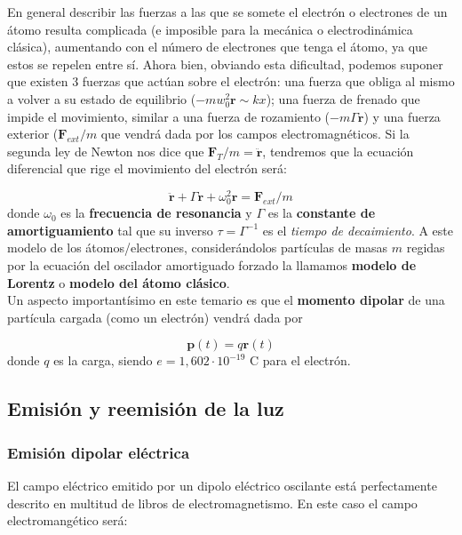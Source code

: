 \documentclass[12pt]{article}
\newcommand{\Fn}{\mathbf{F}}
\newcommand{\rn}{\mathbf{r}}
\newcommand{\pn}{\mathbf{p}}
\numberwithin{equation}{section}
\numberwithin{figure}{section}
\begin{document}
En general describir las fuerzas a las que se somete el electrón o electrones de un átomo resulta complicada (e imposible para la mecánica o electrodinámica clásica), aumentando con el número de electrones que tenga el átomo, ya que estos se repelen entre sí. Ahora bien, obviando esta dificultad, podemos suponer que existen 3 fuerzas que actúan sobre el electrón: una fuerza que obliga al mismo a volver a su estado de equilibrio ($- m w^2_0 \rn \sim kx$); una fuerza de frenado que impide el movimiento, similar a una fuerza de rozamiento ($-m \Gamma \dot{\rn}$) y una fuerza exterior ($\Fn_{ext}/m$ que vendrá dada por los campos electromagnéticos. Si la segunda ley de Newton nos dice que $\Fn_T / m = \ddot{\rn}$, tendremos que la ecuación diferencial que rige el movimiento del electrón será:

\begin{equation}
\ddot{\rn} + \Gamma \dot{\rn} + \omega_0^2 \rn = \Fn_{ext}/m
\end{equation}
donde $\omega_0$ es la \textbf{frecuencia de resonancia} y $\Gamma$ es la \textbf{constante de amortiguamiento} tal que su inverso $\tau = \Gamma^{-1}$ es el \textit{tiempo de decaimiento}. A este modelo de los átomos/electrones, considerándolos partículas de masas $m$ regidas por la ecuación del oscilador amortiguado forzado la llamamos \textbf{modelo de Lorentz} o \textbf{modelo del átomo clásico}.\\

Un aspecto importantísimo en este temario es que el \textbf{momento dipolar} de una partícula cargada (como un electrón) vendrá dada por 

\begin{equation}
\pn (t) = q \rn (t) \label{Ec:7.1.0.02}
\end{equation}
donde $q$ es la carga, siendo $e=1,602 \cdot 10^{-19}$ C para el electrón.
 
\subsection{Emisión y reemisión de la luz}

\subsubsection{Emisión dipolar eléctrica} \label{Subsub:7.2.1}

El campo eléctrico emitido por un dipolo eléctrico oscilante está perfectamente descrito en multitud de libros de electromagnetismo. En este caso el campo electromangético será:
\end{document}
